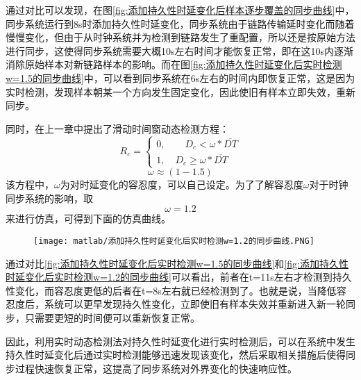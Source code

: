 通过对比可以发现，在图\ref{fig:添加持久性时延变化后样本逐步覆盖的同步曲线}中，同步系统运行到8s时添加持久性时延变化，同步系统由于链路传输延时变化而随着慢慢变化，但由于从时钟系统并为检测到链路发生了重配置，所以还是按原始方法进行同步，这使得同步系统需要大概10s左右时间才能恢复正常，即在这10s内逐渐消除原始样本对新链路样本的影响。而在图\ref{fig:添加持久性时延变化后实时检测w=1.5的同步曲线}中，可以看到同步系统在6s左右的时间内即恢复正常，这是因为实时检测，发现样本朝某一个方向发生固定变化，因此使旧有样本立即失效，重新同步。

同时，在上一章中提出了滑动时间窗动态检测方程：
\begin{equation}
R_{c} = \left\{
  \begin{array}{ll} %
    0, \qquad D_{c} < \omega * \overline{DT} \\
    1, \quad D_{c} \geq \omega * \overline{DT} 
  \end{array}
  \right. 
\end{equation}
\begin{equation}
  \omega \approx (1 - 1.5)
\end{equation}
该方程中，$\omega$为对时延变化的容忍度，可以自己设定。为了了解容忍度$\omega$对于时钟同步系统的影响，取
\begin{equation}
  \omega = 1.2
\end{equation}
来进行仿真，可得到下面的仿真曲线。
\begin{figure}[htbp]
  \centering
  \begin{minipage}[b]{1\textwidth}
    \captionstyle{\centering}
    \centering
    \texttt{[image: matlab/添加持久性时延变化后实时检测w=1.2的同步曲线.PNG]}
  \end{minipage}     
\end{figure}

通过对比\ref{fig:添加持久性时延变化后实时检测w=1.5的同步曲线}和\ref{fig:添加持久性时延变化后实时检测w=1.2的同步曲线}可以看出，前者在t=11s左右才检测到持久性变化，而容忍度更低的后者在t=8s左右就已经检测到了。也就是说，当降低容忍度后，系统可以更早发现持久性变化，立即使旧有样本失效并重新进入新一轮同步，只需要更短的时间便可以重新恢复正常。

因此，利用实时动态检测法对持久性时延变化进行实时检测后，可以在系统中发生持久性时延变化后通过实时检测能够迅速发现该变化，然后采取相关措施后使得同步过程快速恢复正常，这提高了同步系统对外界变化的快速响应性。

